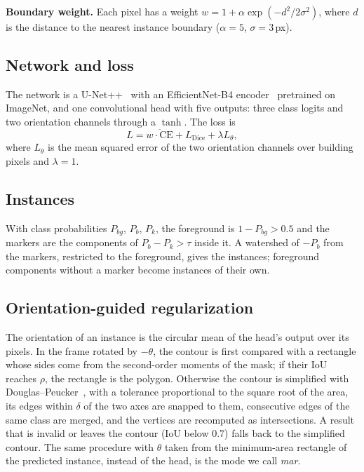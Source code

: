 \documentclass[conference]{IEEEtran}
\begin{document}
\textbf{Boundary weight.} Each pixel has a weight $w=1+\alpha\exp(-d^2/2\sigma^2)$, where $d$ is the distance to the
nearest instance boundary ($\alpha=5$, $\sigma=3$\,px).

\subsection{Network and loss}
The network is a U-Net++~\cite{zhou2018unetpp} with an EfficientNet-B4 encoder~\cite{tan2019efficientnet} pretrained on
ImageNet, and one convolutional head with five outputs: three class logits and two orientation channels through a
$\tanh$. The loss is
\begin{equation}
L = \overline{w\cdot\mathrm{CE}} + L_{\mathrm{Dice}} + \lambda L_\theta ,
\end{equation}
where $L_\theta$ is the mean squared error of the two orientation channels over building pixels and $\lambda=1$.

\subsection{Instances}
With class probabilities $P_{bg}$, $P_b$, $P_k$, the foreground is $1-P_{bg}>0.5$ and the markers are the components of
$P_b-P_k>\tau$ inside it. A watershed of $-P_b$ from the markers, restricted to the foreground, gives the instances;
foreground components without a marker become instances of their own.

\subsection{Orientation-guided regularization}
The orientation of an instance is the circular mean of the head's output over its pixels. In the frame rotated by
$-\theta$, the contour is first compared with a rectangle whose sides come from the second-order moments of the mask; if
their IoU reaches $\rho$, the rectangle is the polygon. Otherwise the contour is simplified with
Douglas--Peucker~\cite{douglas1973}, with a tolerance proportional to the square root of the area, its edges within
$\delta$ of the two axes are snapped to them, consecutive edges of the same class are merged, and the vertices are
recomputed as intersections. A result that is invalid or leaves the contour (IoU below 0.7) falls back to the simplified
contour. The same procedure with $\theta$ taken from the minimum-area rectangle of the predicted instance, instead of
the head, is the mode we call \emph{mar}.
\end{document}
